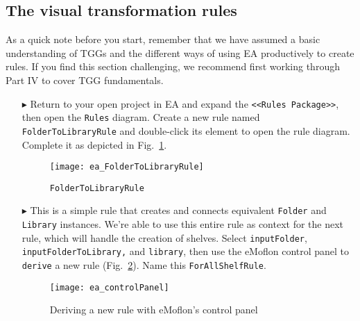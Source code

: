 \newpage
\hypertarget{treeToModel vis}{}
\subsection{The visual transformation rules}
\visHeader

As a quick note before you start, remember that we have assumed a basic understanding of TGGs and the different ways of using EA productively to create rules.
If you find this section challenging, we recommend first working through Part IV to cover TGG fundamentals.

\begin{itemize}

\subsubsection{FolderToLibraryRule} %

\item[$\blacktriangleright$] Return to your open project in EA and expand the \texttt{<<Rules Package>>}, then open the \texttt{Rules} diagram.
Create a new rule named \texttt{Fol\-der\-To\-Lib\-rar\-y\-Rule} and double-click its element to open the rule diagram. Complete it as depicted in
Fig.~\ref{ea:FolderIntoLibrary_Complete}.

\vspace{0.5cm}

\begin{figure}[htbp]
\begin{center}
  \texttt{[image: ea\_FolderToLibraryRule]}
  \caption{\texttt{FolderToLibraryRule}}
  \label{ea:FolderIntoLibrary_Complete}
\end{center}
\end{figure}

\item[$\blacktriangleright$] This is a simple rule that creates and connects equivalent \texttt{Folder} and \texttt{Library} instances. We're able to use this
entire rule as context for the next rule, which will handle the creation of shelves. Select \texttt{inputFolder}, \texttt{in\-put\-Fol\-der\-To\-Lib\-rary,} and
\texttt{library}, then use the eMoflon control panel to \texttt{derive} a new rule (Fig.~\ref{ea:controlPanel}).
Name this \texttt{ForAllShelfRule}.

\vspace{0.5cm}

\begin{figure}[htbp]
\begin{center}
  \texttt{[image: ea\_controlPanel]}
  \caption{Deriving a new rule with eMoflon's control panel}
  \label{ea:controlPanel}
\end{center}
\end{figure}


\end{itemize}

